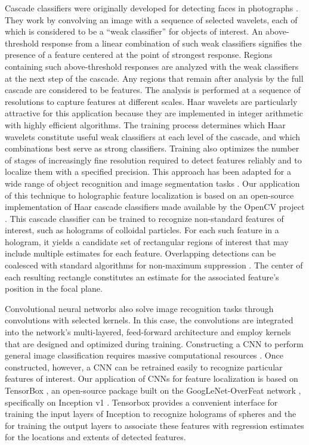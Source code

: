 Cascade classifiers were originally developed for detecting 
faces in photographs \cite{viola2001rapid}. 
They work by convolving an image with a sequence of 
selected wavelets, each of which is considered to be a
``weak classifier'' for objects of interest.
An above-threshold response from a linear combination of such
weak classifiers signifies the presence of a feature
centered at the point of strongest response.
Regions containing such above-threshold responses are analyzed
with the weak classifiers at the next step of the cascade.
Any regions that remain after analysis by the full cascade are
considered to be features.
The analysis is performed at a sequence of resolutions to capture
features at different scales.
Haar wavelets are particularly attractive
for this application because they are implemented in
integer arithmetic with highly efficient algorithms.
The training process determines
which Haar wavelets constitute useful weak classifiers
at each level of the cascade, and which combinations best
serve as strong classifiers.
Training also optimizes the number of stages of increasingly
fine resolution required to detect features reliably and to
localize them with a specified precision.
This approach has been adapted for a wide range of
object recognition and image segmentation tasks
\cite{lienhart2002extended}.
Our application of this technique to holographic feature 
localization is based on an open-source implementation
of Haar cascade classifiers made 
available by the OpenCV project \cite{itseez2015opencv}.
This cascade classifier can be trained to recognize non-standard
features of interest, such as holograms of colloidal particles.
For each such feature in a hologram, it yields
a candidate set of rectangular regions of interest that
may include multiple estimates for each feature.
Overlapping detections can be coalesced with
standard algorithms for non-maximum suppression
\cite{neubeck06}.
The center of each resulting rectangle constitutes an
estimate for the associated feature's position in the focal plane.

Convolutional neural networks also solve image recognition
tasks through convolutions with selected kernels. In this case,
the convolutions are integrated into the network's
multi-layered, feed-forward architecture 
\cite{sermanet2013overfeat} and employ kernels that are designed
and optimized during training.
Constructing a CNN to perform general image classification 
requires massive computational resources \cite{tensorflow2015-whitepaper}.
Once constructed, however, a CNN can be
retrained easily to recognize particular features of interest.
Our application of CNNs for feature localization is based on 
TensorBox \cite{stewart2015endtoend}, an open-source package 
built on the GoogLeNet-OverFeat network \cite{sermanet2013overfeat},
specifically on Inception v1 \cite{szegedy15}.
Tensorbox provides a convenient interface for training the
input layers of Inception to recognize holograms of spheres
and the for training the output layers to associate these features
with regression estimates for the
locations and extents of detected features.



